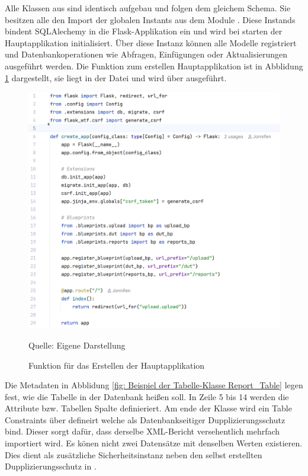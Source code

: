 Alle Klassen aus  sind identisch aufgebau und folgen dem gleichem Schema.
Sie besitzen alle den Import der globalen Instants  aus dem Module .
Diese Instands bindent SQLAlechemy in die Flask-Applikation ein und wird bei starten der Hauptapplikation initialisiert.
Über diese Instanz  können alle Modelle registriert und Datenbankoperationen wie Abfragen, Einfügungen oder Aktualisierungen ausgeführt werden.
Die Funktion zum erstellen Hauptapplikation ist in Abblidung \ref{fig: Funktion für das Erstellen der Hauptapplikation} dargestellt, sie liegt in der Datei  und wird über  ausgeführt.

\begin{figure}[H]
    \centering
    \includegraphics[width=1\textwidth]{Grafiken/createapp.png}
    \caption{Funktion für das Erstellen der Hauptapplikation}
    \label{fig: Funktion für das Erstellen der Hauptapplikation}
    {Quelle: Eigene Darstellung}
\end{figure}

Die Metadaten  in Abblidung \ref{fig: Beispiel der Tabelle-Klasse Report_Table} legen fest, wie die Tabelle in der Datenbank heißen soll.
In Zeile 5 bis 14 werden die Attribute bzw. Tabellen Spalte definieriert.
Am ende der Klasse wird ein Table Constraints über  defineirt welche als Datenbankseitiger Dupplizierungsschutz bind.
Dieser sorgt dafür, dass derselbe XML-Bericht versehentlich mehrfach importiert wird.
Es könen nicht zwei Datensätze mit denselben Werten existieren.
Dies dient als zusätzliche Sicherheitsinstanz neben den selbst erstellten Dupplizierungsschutz in .





